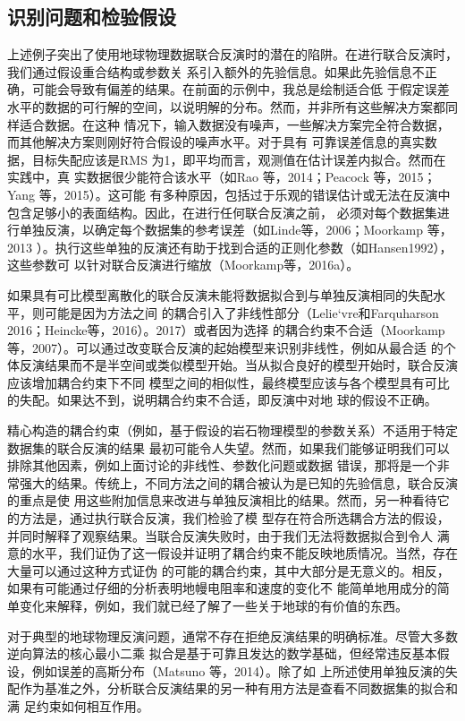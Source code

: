 \subsection{识别问题和检验假设}

上述例子突出了使用地球物理数据联合反演时的潜在的陷阱。在进行联合反演时，我们通过假设重合结构或参数关 系引入额外的先验信息。如果此先验信息不正确，可能会导致有偏差的结果。在前面的示例中，我总是绘制适合低 于假定误差水平的数据的可行解的空间，以说明解的分布。然而，并非所有这些解决方案都同样适合数据。在这种 情况下，输入数据没有噪声，一些解决方案完全符合数据，而其他解决方案则刚好符合假设的噪声水平。对于具有 可靠误差信息的真实数据，目标失配应该是RMS 为1，即平均而言，观测值在估计误差内拟合。然而在实践中，真 实数据很少能符合该水平（如Rao 等，2014；Peacock 等，2015；Yang 等，2015）。这可能 有多种原因，包括过于乐观的错误估计或无法在反演中包含足够小的表面结构。因此，在进行任何联合反演之前， 必须对每个数据集进行单独反演，以确定每个数据集的参考误差（如Linde等，2006；Moorkamp 等，2013 ）。执行这些单独的反演还有助于找到合适的正则化参数（如Hansen1992），这些参数可 以针对联合反演进行缩放（Moorkamp等，2016a）。

如果具有可比模型离散化的联合反演未能将数据拟合到与单独反演相同的失配水平，则可能是因为方法之间 的耦合引入了非线性部分（Lelie`vre和Farquharson 2016；Heincke等，2016）。2017）或者因为选择 的耦合约束不合适（Moorkamp等，2007）。可以通过改变联合反演的起始模型来识别非线性，例如从最合适 的个体反演结果而不是半空间或类似模型开始。当从拟合良好的模型开始时，联合反演应该增加耦合约束下不同 模型之间的相似性，最终模型应该与各个模型具有可比的失配。如果达不到，说明耦合约束不合适，即反演中对地 球的假设不正确。

精心构造的耦合约束（例如，基于假设的岩石物理模型的参数关系）不适用于特定数据集的联合反演的结果 最初可能令人失望。然而，如果我们能够证明我们可以排除其他因素，例如上面讨论的非线性、参数化问题或数据 错误，那将是一个非常强大的结果。传统上，不同方法之间的耦合被认为是已知的先验信息，联合反演的重点是使 用这些附加信息来改进与单独反演相比的结果。然而，另一种看待它的方法是，通过执行联合反演，我们检验了模 型存在符合所选耦合方法的假设，并同时解释了观察结果。当联合反演失败时，由于我们无法将数据拟合到令人 满意的水平，我们证伪了这一假设并证明了耦合约束不能反映地质情况。当然，存在大量可以通过这种方式证伪 的可能的耦合约束，其中大部分是无意义的。相反，如果有可能通过仔细的分析表明地幔电阻率和速度的变化不 能简单地用成分的简单变化来解释，例如，我们就已经了解了一些关于地球的有价值的东西。

对于典型的地球物理反演问题，通常不存在拒绝反演结果的明确标准。尽管大多数逆向算法的核心最小二乘 拟合是基于可靠且发达的数学基础，但经常违反基本假设，例如误差的高斯分布（Matsuno 等，2014）。除了如 上所述使用单独反演的失配作为基准之外，分析联合反演结果的另一种有用方法是查看不同数据集的拟合和满 足约束如何相互作用。

